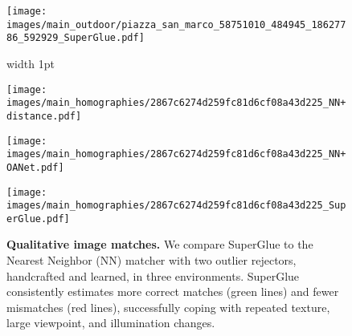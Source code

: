 \documentclass[10pt,twocolumn,letterpaper]{article}
\renewcommand{\*}[1]{\mathbf{#1}}
\newcommand{\0}{\phantom{0}}
\begin{document}
\begin{figure*}[ht!]
\begin{minipage}{0.32\textwidth}
    \vspace{.5mm}
    \texttt{[image: images/main\_outdoor/piazza\_san\_marco\_58751010\_484945\_18627786\_592929\_SuperGlue.pdf]}
\end{minipage}

\vspace{1.5mm}
\begin{minipage}{0.02\textwidth}
\end{minipage}\hfill{\vline width 1pt}\hfill
\hspace{1mm}\begin{minipage}{0.32\textwidth}
    \texttt{[image: images/main\_homographies/2867c6274d259fc81d6cf08a43d225\_NN+distance.pdf]}
\end{minipage}\hspace{1mm}\begin{minipage}{0.32\textwidth}
    \texttt{[image: images/main\_homographies/2867c6274d259fc81d6cf08a43d225\_NN+OANet.pdf]}
\end{minipage}\hspace{1mm}\begin{minipage}{0.32\textwidth}
    \texttt{[image: images/main\_homographies/2867c6274d259fc81d6cf08a43d225\_SuperGlue.pdf]}
\end{minipage}
\vspace{-.3cm}
\caption{{\bf Qualitative image matches.} We compare SuperGlue to the Nearest Neighbor (NN) matcher with two outlier rejectors, handcrafted and learned, in three environments. SuperGlue consistently estimates more correct matches ({\color{green}green} lines) and fewer mismatches ({\color{red}red} lines), successfully coping with repeated texture, large viewpoint, and illumination changes.}
\label{fig:qual-all}


\end{figure*}
\end{document}
